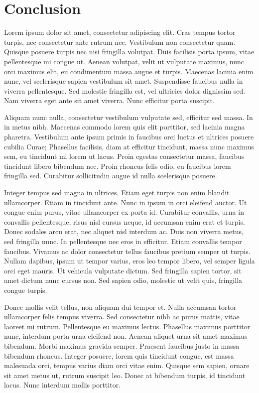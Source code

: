 \section{Conclusion}
Lorem ipsum dolor sit amet, consectetur adipiscing elit. Cras tempus tortor turpis, nec consectetur ante rutrum nec. Vestibulum non consectetur quam. Quisque posuere turpis nec nisi fringilla volutpat. Duis facilisis porta ipsum, vitae pellentesque mi congue ut. Aenean volutpat, velit ut vulputate maximus, nunc orci maximus elit, eu condimentum massa augue et turpis. Maecenas lacinia enim nunc, vel scelerisque sapien vestibulum sit amet. Suspendisse faucibus nulla in viverra pellentesque. Sed molestie fringilla est, vel ultricies dolor dignissim sed. Nam viverra eget ante sit amet viverra. Nunc efficitur porta suscipit.

Aliquam nunc nulla, consectetur vestibulum vulputate sed, efficitur sed massa. In in metus nibh. Maecenas commodo lorem quis elit porttitor, sed lacinia magna pharetra. Vestibulum ante ipsum primis in faucibus orci luctus et ultrices posuere cubilia Curae; Phasellus facilisis, diam at efficitur tincidunt, massa nunc maximus sem, eu tincidunt mi lorem ut lacus. Proin egestas consectetur massa, faucibus tincidunt libero bibendum nec. Proin rhoncus felis odio, eu faucibus lorem fringilla sed. Curabitur sollicitudin augue id nulla scelerisque posuere.

Integer tempus sed magna in ultrices. Etiam eget turpis non enim blandit ullamcorper. Etiam in tincidunt ante. Nunc in ipsum in orci eleifend auctor. Ut congue enim purus, vitae ullamcorper ex porta id. Curabitur convallis, urna in convallis pellentesque, risus nisl cursus neque, id accumsan enim erat et turpis. Donec sodales arcu erat, nec aliquet nisl interdum ac. Duis non viverra metus, sed fringilla nunc. In pellentesque nec eros in efficitur. Etiam convallis tempor faucibus. Vivamus ac dolor consectetur tellus faucibus pretium semper ut turpis. Nullam dapibus, ipsum ut tempor varius, eros leo tempor libero, vel semper ligula orci eget mauris. Ut vehicula vulputate dictum. Sed fringilla sapien tortor, sit amet dictum nunc cursus non. Sed sapien odio, molestie ut velit quis, fringilla congue turpis.

Donec mollis velit tellus, non aliquam dui tempor et. Nulla accumsan tortor ullamcorper felis tempus viverra. Sed consectetur nibh ac purus mattis, vitae laoreet mi rutrum. Pellentesque eu maximus lectus. Phasellus maximus porttitor nunc, interdum porta urna eleifend non. Aenean aliquet urna sit amet maximus bibendum. Morbi maximus gravida semper. Praesent faucibus justo in massa bibendum rhoncus. Integer posuere, lorem quis tincidunt congue, est massa malesuada orci, tempus varius diam orci vitae enim. Quisque sem sapien, ornare sit amet metus ut, rutrum suscipit leo. Donec at bibendum turpis, id tincidunt lacus. Nunc interdum mollis porttitor.

